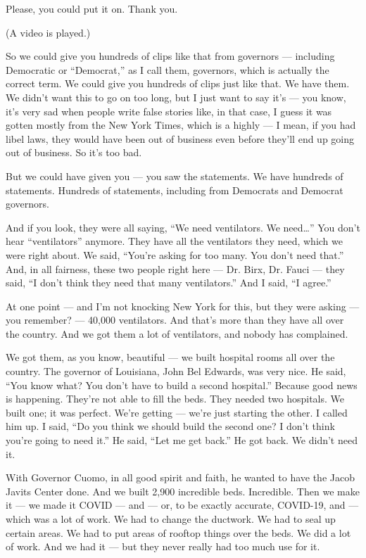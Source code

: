 Please, you could put it on. Thank you.

(A video is played.)

So we could give you hundreds of clips like that from governors ---
including Democratic or ``Democrat,'' as I call them, governors, which
is actually the correct term. We could give you hundreds of clips just
like that. We have them. We didn't want this to go on too long, but I
just want to say it's --- you know, it's very sad when people write
false stories like, in that case, I guess it was gotten mostly from the
New York Times, which is a highly --- I mean, if you had libel laws,
they would have been out of business even before they'll end up going
out of business. So it's too bad.

But we could have given you --- you saw the statements. We have hundreds
of statements. Hundreds of statements, including from Democrats and
Democrat governors.

And if you look, they were all saying, ``We need ventilators. We
need\ldots{}'' You don't hear ``ventilators'' anymore. They have all the
ventilators they need, which we were right about. We said, ``You're
asking for too many. You don't need that.'' And, in all fairness, these
two people right here --- Dr. Birx, Dr. Fauci --- they said, ``I don't
think they need that many ventilators.'' And I said, ``I agree.''

At one point --- and I'm not knocking New York for this, but they were
asking --- you remember? --- 40,000 ventilators. And that's more than
they have all over the country. And we got them a lot of ventilators,
and nobody has complained.

We got them, as you know, beautiful --- we built hospital rooms all over
the country. The governor of Louisiana, John Bel Edwards, was very nice.
He said, ``You know what? You don't have to build a second hospital.''
Because good news is happening. They're not able to fill the beds. They
needed two hospitals. We built one; it was perfect. We're getting ---
we're just starting the other. I called him up. I said, ``Do you think
we should build the second one? I don't think you're going to need it.''
He said, ``Let me get back.'' He got back. We didn't need it.

With Governor Cuomo, in all good spirit and faith, he wanted to have the
Jacob Javits Center done. And we built 2,900 incredible beds.
Incredible. Then we make it --- we made it COVID --- and --- or, to be
exactly accurate, COVID-19, and --- which was a lot of work. We had to
change the ductwork. We had to seal up certain areas. We had to put
areas of rooftop things over the beds. We did a lot of work. And we had
it --- but they never really had too much use for it.

